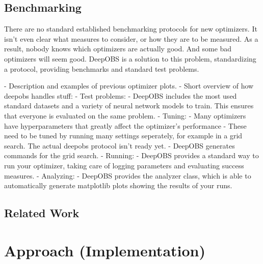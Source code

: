 \documentclass[twoside,12pt,a4paper]{report}
\begin{document}
\section{Benchmarking}
\begin{markdown}
There are no standard established benchmarking protocols for new optimizers. It isn't even clear what measures to consider, or how they are to be measured. As a result, nobody knows which optimizers are actually good. And some bad optimizers will seem good.
DeepOBS is a solution to this problem, standardizing a protocol, providing benchmarks and standard test problems.

- Description and examples of previous optimizer plots.
- Short overview of how deepobs handles stuff:
    - Test problems:
      	- DeepOBS includes the most used standard datasets and a variety of neural network models to train. This ensures that everyone is evaluated on the same problem.
    - Tuning:
    	- Many optimizers have hyperparameters that greatly affect the optimizer's performance
 	    - These need to be tuned by running many settings seperately, for example in a grid search. The actual deepobs protocol isn't ready yet.
      - DeepOBS generates commands for the grid search.
    - Running:
      	- DeepOBS provides a standard way to run your optimizer, taking care of logging parameters and evaluating success measures.
    - Analyzing:
      	- DeepOBS provides the analyzer class, which is able to automatically generate matplotlib plots showing the results of your runs.
\end{markdown}

\section{Related Work}


\chapter{Approach (Implementation)}
\end{document}
